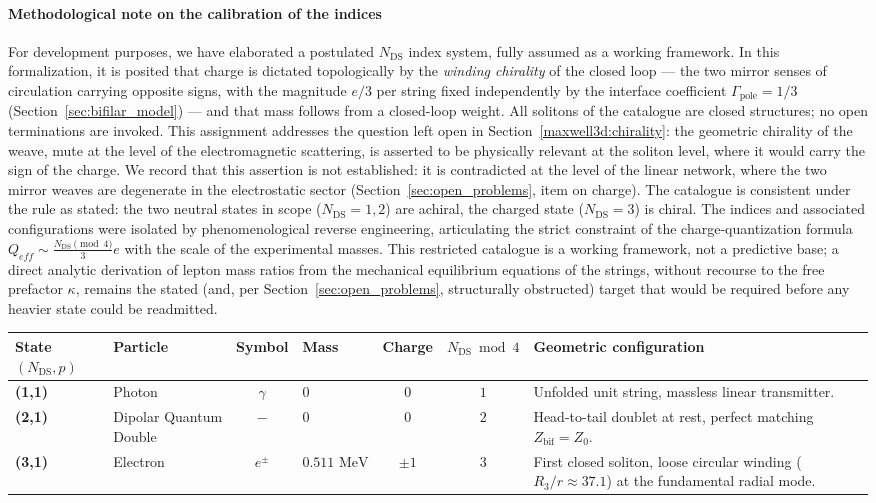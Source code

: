 \documentclass[11pt,a4paper]{article}
\theoremstyle{plain}
\theoremstyle{remark}
\newcommand{\Ncd}{\ensuremath{N_{\mathrm{DS}}}}
\begin{document}
\paragraph{Methodological note on the calibration of the indices}
For development purposes, we have elaborated a postulated $\Ncd$ index system, fully assumed as a working framework. In this formalization, it is posited that charge is dictated topologically by the \emph{winding chirality} of the closed loop --- the two mirror senses of circulation carrying opposite signs, with the magnitude $e/3$ per string fixed independently by the interface coefficient $\Gamma_{\text{pole}} = 1/3$ (Section~\ref{sec:bifilar_model}) --- and that mass follows from a closed-loop weight. All solitons of the catalogue are closed structures; no open terminations are invoked. This assignment addresses the question left open in Section~\ref{maxwell3d:chirality}: the geometric chirality of the weave, mute at the level of the electromagnetic scattering, is asserted to be physically relevant at the soliton level, where it would carry the sign of the charge. We record that this assertion is not established: it is contradicted at the level of the linear network, where the two mirror weaves are degenerate in the electrostatic sector (Section~\ref{sec:open_problems}, item on charge). The catalogue is consistent under the rule as stated: the two neutral states in scope ($\Ncd = 1, 2$) are achiral, the charged state ($\Ncd = 3$) is chiral. The indices and associated configurations were isolated by phenomenological reverse engineering, articulating the strict constraint of the charge-quantization formula $Q_{eff} \sim \frac{\Ncd \pmod 4}{3}e$ with the scale of the experimental masses. This restricted catalogue is a working framework, not a predictive base; a direct analytic derivation of lepton mass ratios from the mechanical equilibrium equations of the strings, without recourse to the free prefactor $\kappa$, remains the stated (and, per Section~\ref{sec:open_problems}, structurally obstructed) target that would be required before any heavier state could be readmitted.

{\small
\renewcommand{\arraystretch}{1.2}
\begin{longtable}{p{1.5cm} p{1.9cm} c p{1.6cm} c c >{\raggedright\arraybackslash}p{4.0cm}}
\toprule
\textbf{State $(\Ncd,p)$} & \textbf{Particle} & \textbf{Symbol} & \textbf{Mass} & \textbf{Charge} & \textbf{$\Ncd \bmod 4$} & \textbf{Geometric configuration} \\
\midrule
\endhead
\bottomrule
\endfoot

\textbf{(1,1)} & Photon & $\gamma$ & $0$ & $0$ & $1$ & Unfolded unit string, massless linear transmitter. \\
\textbf{(2,1)} & Dipolar Quantum Double & $-$ & $0$ & $0$ & $2$ & Head-to-tail doublet at rest, perfect matching $Z_{\text{bif}} = Z_0$. \\
\textbf{(3,1)} & Electron & $e^\pm$ & $0.511\text{ MeV}$ & $\pm 1$ & $3$ & First closed soliton, loose circular winding ($R_3/r \approx 37.1$) at the fundamental radial mode. \\
\end{longtable}}
\end{document}
